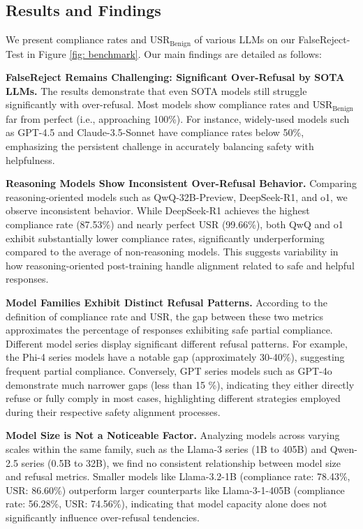 \documentclass{article} %
\begin{document}
\subsection{Results and Findings}

We present compliance rates and \(\text{USR}_{\text{Benign}}\) of various LLMs on our FalseReject-Test in Figure \ref{fig: benchmark}. Our main findings are detailed as follows:

\textbf{FalseReject Remains Challenging: Significant Over-Refusal by SOTA LLMs.} The results demonstrate that even SOTA models still struggle significantly with over-refusal. Most models show compliance rates and \(\text{USR}_{\text{Benign}}\) far from perfect (i.e., approaching 100\%). For instance, widely-used models such as GPT-4.5 and Claude-3.5-Sonnet have compliance rates below 50\%, emphasizing the persistent challenge in accurately balancing safety with helpfulness.

\textbf{Reasoning Models Show Inconsistent Over-Refusal Behavior.} Comparing reasoning-oriented models such as QwQ-32B-Preview, DeepSeek-R1, and o1, we observe inconsistent behavior. While DeepSeek-R1 achieves the highest compliance rate (87.53\%) and nearly perfect \(\text{USR}\) (99.66\%), both QwQ and o1 exhibit substantially lower compliance rates, significantly underperforming compared to the average of non-reasoning models. This suggests variability in how reasoning-oriented post-training handle alignment related to safe and helpful responses.

\textbf{Model Families Exhibit Distinct Refusal Patterns.} According to the definition of compliance rate and \(\text{USR}\), the gap between these two metrics approximates the percentage of responses exhibiting safe partial compliance. Different model series display significant different refusal patterns. For example, the Phi-4 series models have a notable gap (approximately 30-40\%), suggesting frequent partial compliance. Conversely, GPT series models such as GPT-4o demonstrate much narrower gaps (less than 15 \%), indicating they either directly refuse or fully comply in most cases, highlighting different strategies employed during their respective safety alignment processes.

\textbf{Model Size is Not a Noticeable Factor.} Analyzing models across varying scales within the same family, such as the Llama-3 series (1B to 405B) and Qwen-2.5 series (0.5B to 32B), we find no consistent relationship between model size and refusal metrics. Smaller models like Llama-3.2-1B (compliance rate: 78.43\%, \(\text{USR}\): 86.60\%) outperform larger counterparts like Llama-3-1-405B (compliance rate: 56.28\%, \(\text{USR}\): 74.56\%), indicating that model capacity alone does not significantly influence over-refusal tendencies.
\end{document}
